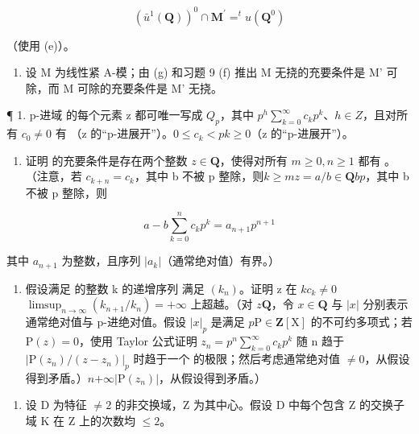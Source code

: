 \[
(\bar {u} ^ {1} (\mathbf {Q})) ^ {0} \cap \mathbf {M} ^ {\prime} = ^ {t} u (\mathbf {Q} ^ {0})
\]

（使用 (e)）。

\begin{enumerate}
\def\labelenumi{(\alph{enumi})}
\setcounter{enumi}{7}
\tightlist
\item
  设 M 为线性紧 A-模；由 (g) 和习题 9 (f) 推出 M 无挠的充要条件是 M' 可除，而 M 可除的充要条件是 M' 无挠。
\end{enumerate}


¶ 1. p-进域  的每个元素 z 都可唯一写成 \(Q_{p}\)，其中 \(p^{h}\sum_{k=0}^{\infty}c_{k}p^{k}\)、\(h\in Z\)，且对所有 \(c_{0}\neq0\) 有 （z 的“p-进展开”）。\(0\leqslant c_{k}<p\)\(k\geqslant0\)（z 的“p-进展开”）。

\begin{enumerate}
\def\labelenumi{(\alph{enumi})}
\tightlist
\item
  证明  的充要条件是存在两个整数 \(z \in \mathbf{Q}\)，使得对所有 \(m \geqslant 0, n \geqslant 1\) 都有 。（注意，若 \(c_{k+n} = c_k\)，其中 b 不被 p 整除，则\(k \geqslant m\)\(z = a / b \in \mathbf{Q}\)\(b\)\(p\)，其中 b 不被 p 整除，则
\end{enumerate}

\[
a - b \sum_ {k = 0} ^ {n} c _ {k} p ^ {k} = a _ {n + 1} p ^ {n + 1}
\]

其中 \(a_{n+1}\) 为整数，且序列 \(|a_k|\)（通常绝对值）有界。）

\begin{enumerate}
\def\labelenumi{(\alph{enumi})}
\setcounter{enumi}{1}
\tightlist
\item
  假设满足  的整数 k 的递增序列  满足 \((k_n)\)。证明 z 在 \(k\)\(c_k \neq 0\)\(\limsup_{n \to \infty} (k_{n+1}/k_n) = +\infty\) 上超越。（对 \(z\)\(\mathbf{Q}\)，令 \(x \in \mathbf{Q}\) 与 \(|x|\) 分别表示通常绝对值与 p-进绝对值。假设 \(|x|_p\) 是满足 \(p\)\(\mathrm{P} \in \mathbf{Z}[\mathrm{X}]\) 的不可约多项式；若 \(\mathrm{P}(z) = 0\)，使用 Taylor 公式证明 \(z_n = p^n \sum_{k=0}^{\infty} c_k p^k\) 随 n 趋于 \(|\mathrm{P}(z_n)/(z - z_n)|_p\) 时趋于一个  的极限；然后考虑通常绝对值 \(\neq 0\)，从假设得到矛盾。）\(n\)\(+\infty\)\(|\mathrm{P}(z_n)|\)，从假设得到矛盾。）
\end{enumerate}

\begin{enumerate}
\def\labelenumi{\arabic{enumi}.}
\setcounter{enumi}{1}
\tightlist
\item
  设 D 为特征 \(\neq2\) 的非交换域，Z 为其中心。假设 D 中每个包含 Z 的交换子域 K 在 Z 上的次数均 \(\leqslant2\)。
\end{enumerate}

